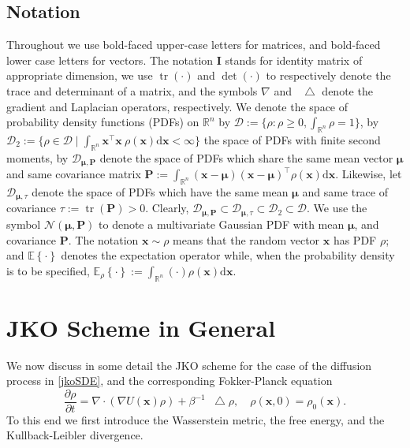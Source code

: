 \documentclass[letterpaper,10pt,twocolumn,conference]{ieeeconf}
\newcommand*\Laplacian{\mathop{}\!\mathbin\bigtriangleup}
\newcommand{\mR}{{\mathbb R}}
\newcommand{\cD}{{\mathscr{D}}}
\newcommand{\bbx}{{\bm{x}}}
\newcommand{\bbP}{\bm{P}}
\newcommand{\tr}{\operatorname{tr}}
\begin{document}
\subsection*{Notation}
Throughout we use bold-faced upper-case letters for matrices, and bold-faced lower case letters for vectors. The notation $\bm{I}$ stands for identity matrix of appropriate dimension, we use $\tr(\cdot)$ and $\det(\cdot)$ to respectively denote the trace and determinant of a matrix, and the symbols $\nabla$ and $\Laplacian$ denote the gradient and Laplacian operators, respectively. We denote the space of probability density functions (PDFs) on $\mR^n$ by $\cD := \{\rho: \rho \geq 0, \int_{\mR^n} \rho = 1\}$, by $\cD_2:=\{\rho\in\cD \mid \int_{\mR^n} \bm{x}^{\top}\bm{x}\:\rho(\bm{x})\mathrm{d}\bm{x} < \infty\}$ the space of PDFs with finite second moments, by $\cD_{\bm{\mu},\bm{P}}$ denote the space of PDFs which share the same mean vector $\bm{\mu}$ and same covariance matrix $\bbP:=\int_{\mR^n}(\bbx-\bm{\mu})(\bbx-\bm{\mu})^\top \rho(\bbx)\mathrm{d}\bbx$. Likewise, let $\cD_{\bm{\mu},\tau}$ denote the space of PDFs which have the same mean $\bm{\mu}$ and same trace of covariance $\tau:=\tr(\bbP)>0$. Clearly, $\cD_{\bm{\mu},\bm{P}} \subset \cD_{\bm{\mu},\tau} \subset \cD_{2} \subset \cD$. We use the symbol $\mathcal{N}\left(\bm{\mu},\bm{P}\right)$ to denote a multivariate Gaussian PDF with mean $\bm{\mu}$, and covariance $\bm{P}$. The notation $\bbx\sim\rho$ means that the random vector $\bbx$ has PDF $\rho$; and $\mathbb{E}\left\{\cdot\right\}$ denotes the expectation operator while, when the probability density is to be specified, $\mathbb{E}_\rho\left\{\cdot\right\}:=\int_{\mR^n}(\cdot)\rho(\bbx)\mathrm{d}\bbx$.




\section{JKO Scheme in General}

We now discuss in some detail the JKO scheme for the case of the diffusion process in \eqref{jkoSDE}, and the corresponding Fokker-Planck equation \cite{RiskenBook1989}
\begin{equation}\label{eq:FP}
\frac{\partial\rho}{\partial t} = \nabla\cdot\left(\nabla U(\bm{x})\rho\right) + \beta^{-1}\Laplacian\rho, \quad \rho(\bm{x},0)=\rho_0(\bm{x}).
\end{equation}
To this end we first introduce the Wasserstein metric, the free energy, and the Kullback-Leibler divergence.
\end{document}

